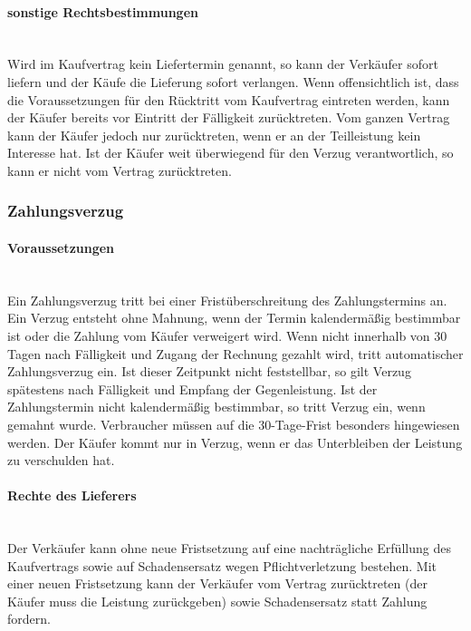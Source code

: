 \paragraph{sonstige Rechtsbestimmungen}~\\
Wird im Kaufvertrag kein Liefertermin genannt, so kann der Verkäufer sofort liefern und der Käufe die Lieferung sofort verlangen. Wenn offensichtlich ist, dass die Voraussetzungen für den Rücktritt vom Kaufvertrag eintreten werden, kann der Käufer bereits vor Eintritt der Fälligkeit zurücktreten. Vom ganzen Vertrag kann der Käufer jedoch nur zurücktreten, wenn er an der Teilleistung kein Interesse hat. Ist der Käufer weit überwiegend für den Verzug verantwortlich, so kann er nicht vom Vertrag zurücktreten.
	
\subsubsection{Zahlungsverzug}

\paragraph{Voraussetzungen}~\\
Ein Zahlungsverzug tritt bei einer Fristüberschreitung des Zahlungstermins an. Ein Verzug entsteht ohne Mahnung, wenn der Termin kalendermäßig bestimmbar ist oder die Zahlung vom Käufer verweigert wird. Wenn nicht innerhalb von 30 Tagen nach Fälligkeit und Zugang der Rechnung gezahlt wird, tritt automatischer Zahlungsverzug ein. Ist dieser Zeitpunkt nicht feststellbar, so gilt Verzug spätestens nach Fälligkeit und Empfang der Gegenleistung. Ist der Zahlungstermin nicht kalendermäßig bestimmbar, so tritt Verzug ein, wenn gemahnt wurde. Verbraucher müssen auf die 30-Tage-Frist besonders hingewiesen werden. Der Käufer kommt nur in Verzug, wenn er das Unterbleiben der Leistung zu verschulden hat.
	
\paragraph{Rechte des Lieferers}~\\
Der Verkäufer kann ohne neue Fristsetzung auf eine nachträgliche Erfüllung des Kaufvertrags sowie auf Schadensersatz wegen Pflichtverletzung bestehen. Mit einer neuen Fristsetzung kann der Verkäufer vom Vertrag zurücktreten (der Käufer muss die Leistung zurückgeben) sowie Schadensersatz statt Zahlung fordern.
	
